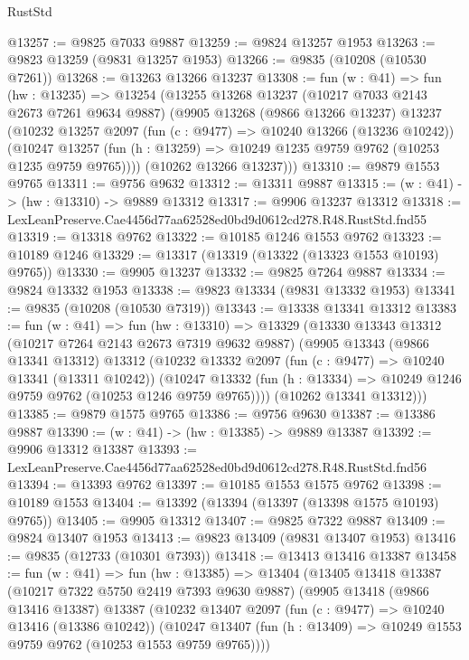 \begin{lexlean}{RustStd}
\begin{coremodule}
@13257 := @9825 @7033 @9887
@13259 := @9824 @13257 @1953
@13263 := @9823 @13259 (@9831 @13257 @1953)
@13266 := @9835 (@10208 (@10530 @7261))
@13268 := @13263 @13266 @13237
@13308 := fun (w : @41) =>
  fun (hw : @13235) =>
  @13254
    (@13255
      @13268
      @13237
      (@10217 @7033 @2143 @2673 @7261 @9634 @9887)
      (@9905
        @13268
        (@9866 @13266 @13237)
        @13237
        (@10232
          @13257
          @2097
          (fun (c : @9477) => @10240 @13266 (@13236 @10242))
          (@10247 @13257 (fun (h : @13259) => @10249 @1235 @9759 @9762 (@10253 @1235 @9759 @9765))))
        (@10262 @13266 @13237)))
@13310 := @9879 @1553 @9765
@13311 := @9756 @9632
@13312 := @13311 @9887
@13315 := (w : @41) -> (hw : @13310) -> @9889 @13312
@13317 := @9906 @13237 @13312
@13318 := LexLeanPreserve.Cae4456d77aa62528ed0bd9d0612cd278.R48.RustStd.fnd55
@13319 := @13318 @9762
@13322 := @10185 @1246 @1553 @9762
@13323 := @10189 @1246
@13329 := @13317 (@13319 (@13322 (@13323 @1553 @10193) @9765))
@13330 := @9905 @13237
@13332 := @9825 @7264 @9887
@13334 := @9824 @13332 @1953
@13338 := @9823 @13334 (@9831 @13332 @1953)
@13341 := @9835 (@10208 (@10530 @7319))
@13343 := @13338 @13341 @13312
@13383 := fun (w : @41) =>
  fun (hw : @13310) =>
  @13329
    (@13330
      @13343
      @13312
      (@10217 @7264 @2143 @2673 @7319 @9632 @9887)
      (@9905
        @13343
        (@9866 @13341 @13312)
        @13312
        (@10232
          @13332
          @2097
          (fun (c : @9477) => @10240 @13341 (@13311 @10242))
          (@10247 @13332 (fun (h : @13334) => @10249 @1246 @9759 @9762 (@10253 @1246 @9759 @9765))))
        (@10262 @13341 @13312)))
@13385 := @9879 @1575 @9765
@13386 := @9756 @9630
@13387 := @13386 @9887
@13390 := (w : @41) -> (hw : @13385) -> @9889 @13387
@13392 := @9906 @13312 @13387
@13393 := LexLeanPreserve.Cae4456d77aa62528ed0bd9d0612cd278.R48.RustStd.fnd56
@13394 := @13393 @9762
@13397 := @10185 @1553 @1575 @9762
@13398 := @10189 @1553
@13404 := @13392 (@13394 (@13397 (@13398 @1575 @10193) @9765))
@13405 := @9905 @13312
@13407 := @9825 @7322 @9887
@13409 := @9824 @13407 @1953
@13413 := @9823 @13409 (@9831 @13407 @1953)
@13416 := @9835 (@12733 (@10301 @7393))
@13418 := @13413 @13416 @13387
@13458 := fun (w : @41) =>
  fun (hw : @13385) =>
  @13404
    (@13405
      @13418
      @13387
      (@10217 @7322 @5750 @2419 @7393 @9630 @9887)
      (@9905
        @13418
        (@9866 @13416 @13387)
        @13387
        (@10232
          @13407
          @2097
          (fun (c : @9477) => @10240 @13416 (@13386 @10242))
          (@10247 @13407 (fun (h : @13409) => @10249 @1553 @9759 @9762 (@10253 @1553 @9759 @9765))))

\end{coremodule}
\end{lexlean}

